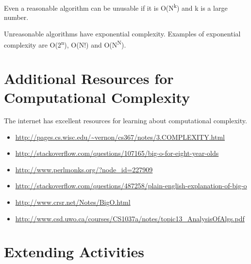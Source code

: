 Even a reasonable algorithm can be unusable if it is O(N\textsuperscript{k}) and k is a large number.

Unreasonable algorithms have exponential complexity.   Examples of exponential complexity are O(2\textsuperscript{n}), O(N!) and O(N\textsuperscript{N}).

\section {Additional Resources for Computational Complexity}

The internet has excellent resources for learning about computational
complexity. 

\begin{itemize}
\item \url{http://pages.cs.wisc.edu/~vernon/cs367/notes/3.COMPLEXITY.html}
\item  \url{http://stackoverflow.com/questions/107165/big-o-for-eight-year-olds}
\item  \url{http://www.perlmonks.org/?node_id=227909}
\item  \url{http://stackoverflow.com/questions/487258/plain-english-explanation-of-big-o}
\item  \url{http://www.crsr.net/Notes/BigO.html}
\item  \url{http://www.csd.uwo.ca/courses/CS1037a/notes/topic13_AnalysisOfAlgs.pdf}
\end{itemize}

\section{Extending Activities}

